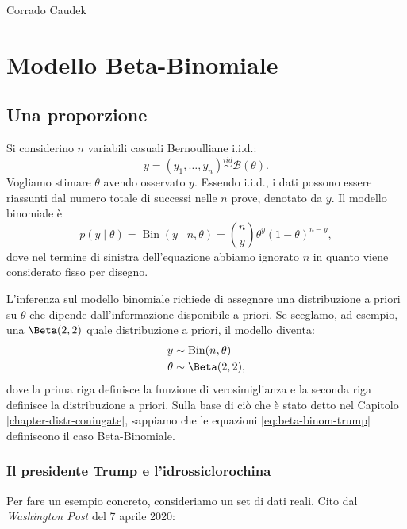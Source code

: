 \documentclass[
  10pt,
  italian,
  a4paper,
  extrafontsizes,onecolumn,openright
  ]{memoir}
\DeclareMathOperator{\Bin}{Bin} %
\begin{document}
\bigskip

Corrado Caudek

\mainmatter

\hypertarget{mod-binom}{%
\chapter{Modello Beta-Binomiale}\label{mod-binom}}

\hypertarget{una-proporzione}{%
\section{Una proporzione}\label{una-proporzione}}

Si considerino \(n\) variabili casuali Bernoulliane i.i.d.:
\[
y = (y_1, \dots, y_n) \stackrel{iid}{\sim} \mathcal{B}(\theta).
\]
\noindent
Vogliamo stimare \(\theta\) avendo osservato \(y\). Essendo i.i.d., i dati possono essere riassunti dal numero totale di successi nelle \(n\) prove, denotato da \(y\). Il modello binomiale è
\begin{equation}
p(y \mid \theta) = \Bin(y \mid n, \theta) = \binom{n}{y}\theta^y (1 -\theta)^{n-y},
\end{equation}
\noindent
dove nel termine di sinistra dell'equazione abbiamo ignorato \(n\) in quanto viene considerato fisso per disegno.

L'inferenza sul modello binomiale richiede di assegnare una distribuzione a priori su \(\theta\) che dipende dall'informazione disponibile a priori. Se sceglamo, ad esempio, una \(\Beta(2, 2)\) quale distribuzione a priori, il modello diventa:
\begin{align}
y &\sim \Bin(n, \theta) \notag\\
\theta &\sim \Beta(2, 2),
\label{eq:beta-binom-trump}
\end{align}
\noindent
dove la prima riga definisce la funzione di verosimiglianza e la seconda riga definisce la distribuzione a priori. Sulla base di ciò che è stato detto nel Capitolo \ref{chapter-distr-coniugate}, sappiamo che le equazioni \eqref{eq:beta-binom-trump} definiscono il caso Beta-Binomiale.

\hypertarget{il-presidente-trump-e-lidrossiclorochina}{%
\subsection{Il presidente Trump e l'idrossiclorochina}\label{il-presidente-trump-e-lidrossiclorochina}}

Per fare un esempio concreto, consideriamo un set di dati reali. Cito dal \emph{Washington Post} del 7 aprile 2020:
\end{document}

